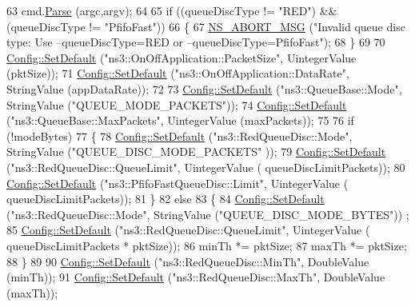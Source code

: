 \begin{DoxyCode}
63   cmd.\hyperlink{classns3_1_1CommandLine_a5c10b85b3207e5ecb48d907966923156}{Parse} (argc,argv);
64 
65   \textcolor{keywordflow}{if} ((queueDiscType != \textcolor{stringliteral}{"RED"}) && (queueDiscType != \textcolor{stringliteral}{"PfifoFast"}))
66     \{
67       \hyperlink{group__fatal_ga51ac4699be799d772ae7258d1ef6af21}{NS\_ABORT\_MSG} (\textcolor{stringliteral}{"Invalid queue disc type: Use --queueDiscType=RED or
       --queueDiscType=PfifoFast"});
68     \}
69 
70   \hyperlink{group__config_ga2e7882df849d8ba4aaad31c934c40c06}{Config::SetDefault} (\textcolor{stringliteral}{"ns3::OnOffApplication::PacketSize"}, UintegerValue (pktSize));
71   \hyperlink{group__config_ga2e7882df849d8ba4aaad31c934c40c06}{Config::SetDefault} (\textcolor{stringliteral}{"ns3::OnOffApplication::DataRate"}, StringValue (appDataRate));
72 
73   \hyperlink{group__config_ga2e7882df849d8ba4aaad31c934c40c06}{Config::SetDefault} (\textcolor{stringliteral}{"ns3::QueueBase::Mode"}, StringValue (\textcolor{stringliteral}{"QUEUE\_MODE\_PACKETS"}));
74   \hyperlink{group__config_ga2e7882df849d8ba4aaad31c934c40c06}{Config::SetDefault} (\textcolor{stringliteral}{"ns3::QueueBase::MaxPackets"}, UintegerValue (maxPackets));
75 
76   \textcolor{keywordflow}{if} (!modeBytes)
77   \{
78     \hyperlink{group__config_ga2e7882df849d8ba4aaad31c934c40c06}{Config::SetDefault} (\textcolor{stringliteral}{"ns3::RedQueueDisc::Mode"}, StringValue (\textcolor{stringliteral}{"QUEUE\_DISC\_MODE\_PACKETS"}
      ));
79     \hyperlink{group__config_ga2e7882df849d8ba4aaad31c934c40c06}{Config::SetDefault} (\textcolor{stringliteral}{"ns3::RedQueueDisc::QueueLimit"}, UintegerValue (
      queueDiscLimitPackets));
80     \hyperlink{group__config_ga2e7882df849d8ba4aaad31c934c40c06}{Config::SetDefault} (\textcolor{stringliteral}{"ns3::PfifoFastQueueDisc::Limit"}, UintegerValue (
      queueDiscLimitPackets));
81   \}
82   \textcolor{keywordflow}{else} 
83   \{
84     \hyperlink{group__config_ga2e7882df849d8ba4aaad31c934c40c06}{Config::SetDefault} (\textcolor{stringliteral}{"ns3::RedQueueDisc::Mode"}, StringValue (\textcolor{stringliteral}{"QUEUE\_DISC\_MODE\_BYTES"}))
      ;
85     \hyperlink{group__config_ga2e7882df849d8ba4aaad31c934c40c06}{Config::SetDefault} (\textcolor{stringliteral}{"ns3::RedQueueDisc::QueueLimit"}, UintegerValue (
      queueDiscLimitPackets * pktSize));
86     minTh *= pktSize;
87     maxTh *= pktSize;
88   \}
89 
90   \hyperlink{group__config_ga2e7882df849d8ba4aaad31c934c40c06}{Config::SetDefault} (\textcolor{stringliteral}{"ns3::RedQueueDisc::MinTh"}, DoubleValue (minTh));
91   \hyperlink{group__config_ga2e7882df849d8ba4aaad31c934c40c06}{Config::SetDefault} (\textcolor{stringliteral}{"ns3::RedQueueDisc::MaxTh"}, DoubleValue (maxTh));

\end{DoxyCode}
